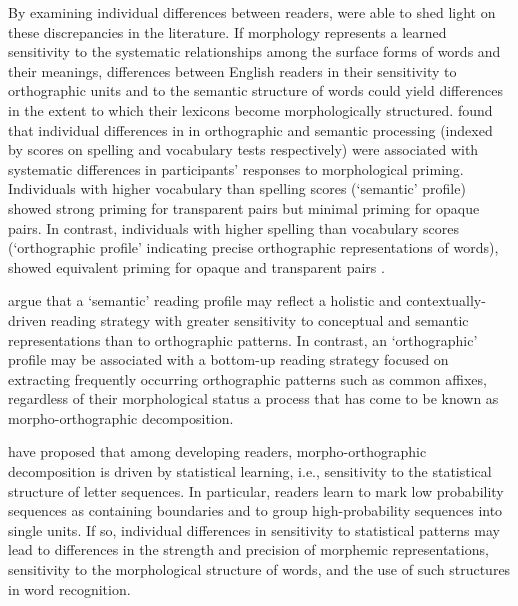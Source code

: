 \documentclass[preprint,12pt, authoryear, review]{elsarticle}
\begin{document}
By examining individual differences between readers, {\renewcommand\&{and}\citet{andrewsMorphologicalPrimingStronger2013}}  were able to shed light on these discrepancies in the literature.  If morphology represents a learned sensitivity to the systematic relationships among the surface forms of words and their meanings, differences between English readers in their sensitivity to orthographic units and to the semantic structure of words could  yield differences in the extent to which their lexicons become morphologically structured.  {\renewcommand\&{and}\citet{andrewsMorphologicalPrimingStronger2013}} found that individual differences in in orthographic and semantic processing (indexed by scores on spelling and vocabulary tests respectively) were associated with systematic differences in participants' responses to morphological priming.  Individuals with higher vocabulary than spelling scores (`semantic' profile) showed strong priming for transparent pairs but minimal priming for opaque pairs. In contrast, individuals with higher spelling than vocabulary scores (‘orthographic profile’ indicating precise orthographic representations of words), showed equivalent priming for opaque and transparent pairs \citep{andrewsMorphologicalPrimingStronger2013}.

{\renewcommand\&{and}\citet{andrewsMorphologicalPrimingStronger2013}} argue that a `semantic' reading profile may reflect a holistic and contextually-driven reading strategy with greater sensitivity to conceptual and semantic representations than to orthographic patterns.  In contrast, an `orthographic' profile may be associated with a bottom-up reading strategy focused on extracting  frequently occurring orthographic patterns such as common affixes, regardless of their morphological status a process that has come to be known as morpho-orthographic decomposition. 
 
{\renewcommand\&{and}\citet{rastleMorphologicalDecompositionBased2008}} have proposed that among developing readers, morpho-orthographic decomposition is driven by statistical learning, i.e., sensitivity to the statistical structure of letter sequences.  In particular, readers learn to  mark low probability sequences as containing boundaries and to group high-probability sequences into single units.  If so, individual differences in sensitivity to statistical patterns may lead to differences in the strength and precision of morphemic representations,  sensitivity to the morphological structure of words, and the use of such structures in word recognition.
\end{document}
